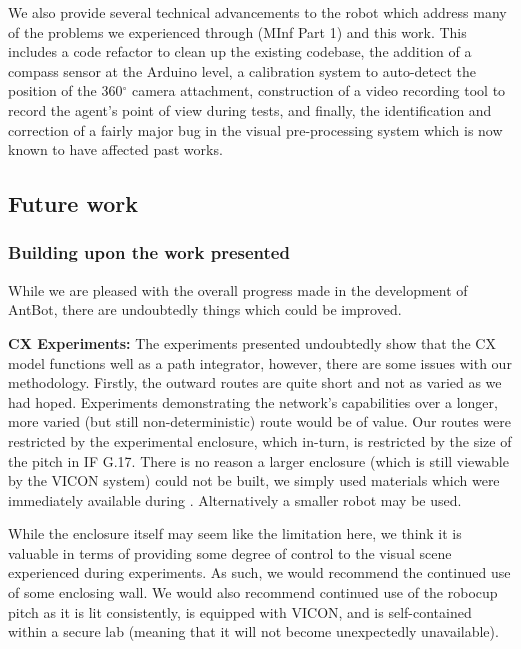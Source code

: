 \documentclass[a4paper,11pt,twoside,openright]{article}
\begin{document}
We also provide several technical advancements to the robot which
address many of the problems we experienced through
\cite{Mitchell2018} (MInf Part 1) and this work. This includes a code refactor to
clean up the existing codebase, the addition of a compass sensor at
the Arduino level, a calibration system to auto-detect the position of
the 360$^\circ$ camera attachment, construction of a video recording
tool to record the agent's point of view during tests, and finally,
the identification and correction of a fairly major bug in the visual
pre-processing system which is now known to have affected past works.

\subsection{Future work}
\subsubsection{Building upon the work presented}\label{sec:future}
While we are pleased with the overall progress made in the
development of AntBot, there are undoubtedly things which could be
improved.\newline\par

\textbf{CX Experiments:} The experiments presented undoubtedly show
that the CX model functions well as a path integrator, however, there
are some issues with our methodology. Firstly, the outward routes are
quite short and not as varied as we had hoped. Experiments
demonstrating the network's capabilities over a longer, more varied
(but still non-deterministic) route would be of value. Our routes were
restricted by the experimental enclosure, which in-turn, is restricted
by the size of the pitch in IF G.17. There is no reason a larger
enclosure (which is still viewable by the VICON system) could not be
built, we simply used materials which were immediately available
during \cite{Mitchell2018}. Alternatively a smaller robot may be used.
\newline\par

While the enclosure itself may seem like the limitation here, we think
it is valuable in terms of providing some degree of control to the
visual scene experienced during experiments. As such, we would
recommend the continued use of some enclosing wall. We would also
recommend continued use of the robocup pitch as it is lit
consistently, is equipped with VICON, and is self-contained within a
secure lab (meaning that it will not become unexpectedly unavailable).
\newline\par
\end{document}
